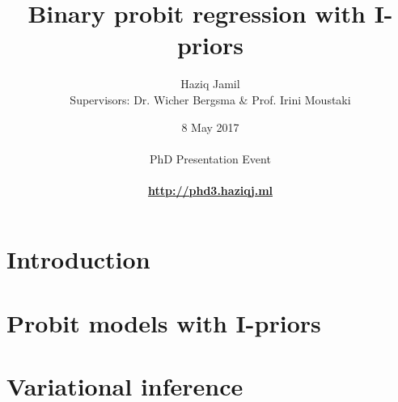 \documentclass[]{beamer}
\begin{document}

\title[I-prior probit]{Binary probit regression with I-priors}
\author[Haziq Jamil]{
  \large{Haziq Jamil}\\ 
  \footnotesize{Supervisors: Dr. Wicher Bergsma \& Prof. Irini Moustaki}
}
\date[8 May 2017]{
  8 May 2017\\
  \hspace{1cm}\\
  PhD Presentation Event\\
  \hspace{1cm}\\
  \href{http://phd3.haziqj.ml}{\color{fu-red!60} \textbf{http://phd3.haziqj.ml}}
}

\mytitle


\mytoc


\section{Introduction}


\section[Probit with I-priors]{Probit models with I-priors}
\transition


\section[Variational]{Variational inference}
\transition


\end{document}
